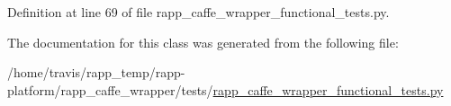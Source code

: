 Definition at line 69 of file rapp\-\_\-caffe\-\_\-wrapper\-\_\-functional\-\_\-tests.\-py.



The documentation for this class was generated from the following file\-:\begin{DoxyCompactItemize}
\item 
/home/travis/rapp\-\_\-temp/rapp-\/platform/rapp\-\_\-caffe\-\_\-wrapper/tests/\hyperlink{rapp__caffe__wrapper__functional__tests_8py}{rapp\-\_\-caffe\-\_\-wrapper\-\_\-functional\-\_\-tests.\-py}\end{DoxyCompactItemize}
